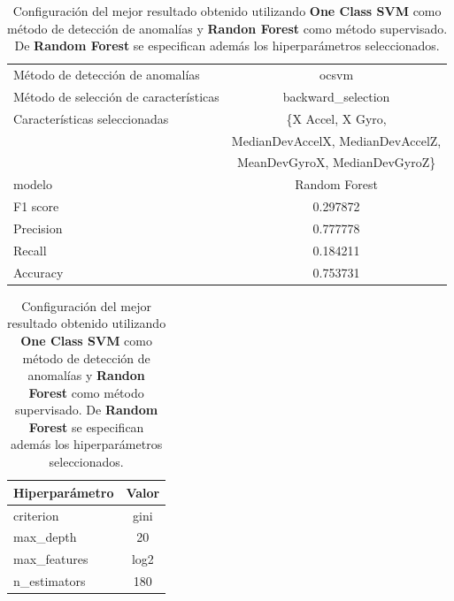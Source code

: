 \begin{appendices}
		\begin{table}[htb]
			\centering
			\caption{Configuración del mejor resultado obtenido utilizando \textbf{One Class SVM} como método de detección de anomalías y \textbf{Randon Forest}
			como método supervisado. De \textbf{Random Forest} se especifican además los hiperparámetros seleccionados.}
			\label{table:36}
			\begin{tabular}{lc}
				\toprule
					  Método de detección de anomalías &                                              ocsvm \\
				Método de selección de características &                                 backward\_selection \\
						 Características seleccionadas & \{X Accel, X Gyro, \\
						                               &   MedianDevAccelX, MedianDevAccelZ, \\
						                               &  MeanDevGyroX, MedianDevGyroZ\}\\
												modelo &                                      Random Forest \\
											  F1 score &                                           0.297872 \\
											 Precision &                                           0.777778 \\
												Recall &                                           0.184211 \\
											  Accuracy &                                           0.753731 \\
				\bottomrule
			\end{tabular}
			\newline
			\newline

			\begin{tabular}{lc}
				\toprule
				Hiperparámetro & Valor \\
				\midrule
					 criterion &  gini \\
					 max\_depth &    20 \\
				  max\_features &  log2 \\
				  n\_estimators &   180 \\
				\bottomrule
			\end{tabular}
			
		\end{table}

\end{appendices}
